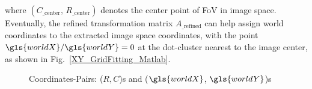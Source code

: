 \noindent
where \((C_{\text{\_center}}, \, R_{\text{\_center}})\) denotes the center point of \gls{FoV} in image space. Eventually, the refined transformation matrix $A_{\text{\_refined}}$ can help assign world coordinates to the extracted image space coordinates, with the point \(\gls{worldX}/\gls{worldY}=0\) at the dot-cluster nearest to the image center, as shown in Fig.~\ref{XY_GridFitting_Matlab}.
%
 \begin{figure}[t]
\hspace*{-0.3cm}
\centering
{}
{}
%
\caption{Coordinates-Pairs: (\(R, C\))s and (\(\gls{worldX}\), \(\gls{worldY}\))s}
\label{Grid_Fitting}
\end{figure}%

